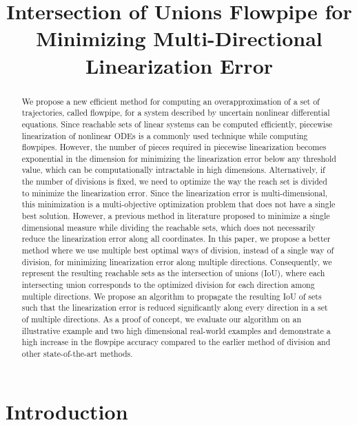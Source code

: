 


\title{Intersection of Unions Flowpipe for Minimizing Multi-Directional Linearization Error}
\author{}
\institute{}
%
    
\maketitle
%
\begin{abstract}
We propose a new efficient method for computing an overapproximation
of a set of trajectories, called flowpipe, for a system
described by uncertain nonlinear differential equations.  Since
reachable sets of linear systems can be computed efficiently,
piecewise linearization of nonlinear ODEs is a commonly used technique
while computing flowpipes.  However, the number of pieces required in
piecewise linearization becomes exponential in the dimension for
minimizing the linearization error below any threshold value, which
can be computationally intractable in high dimensions.  Alternatively,
if the number of divisions is fixed, we need to optimize the way the
reach set is divided to minimize the linearization error.  Since the
linearization error is multi-dimensional, this minimization is a
multi-objective optimization problem that does not have a single best
solution.  However, a previous method in literature proposed to
minimize a single dimensional measure while dividing the reachable
sets, which does not necessarily reduce the linearization error along
all coordinates.  In this paper, we propose a better method where we
use multiple best optimal ways of division, instead of a single way of
division, for minimizing linearization error along multiple
directions.  Consequently, we represent the resulting reachable sets
as the intersection of unions (IoU), where each intersecting union
corresponds to the optimized division for each direction among
multiple directions.  We propose an algorithm to propagate the
resulting IoU of sets such that the linearization error is reduced
significantly along every direction in a set of multiple directions.
As a proof of concept, we evaluate our algorithm on an illustrative
example and two high dimensional real-world examples and demonstrate a
high increase in the flowpipe accuracy compared to the earlier method
of division and other state-of-the-art methods.
\end{abstract}

\section{Introduction}

%
